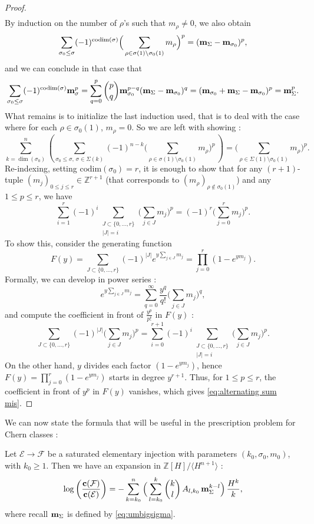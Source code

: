 \documentclass[a4paper,10pt]{amsart}
\theoremstyle{plain}{
    \newtheorem{theorem}{Theorem}[section]
    \newtheorem{lemma}[theorem]{Lemma}
    \newtheorem{corollary}[theorem]{Corollary}
    \newtheorem{proposition}[theorem]{Proposition}
    \newtheorem{conjecture}[theorem]{Conjecture}
}
\theoremstyle{definition}{
    \newtheorem{definition}[theorem]{Definition}
    \newtheorem{defn-thm}[theorem]{Definition-Theorem}
    \newtheorem{example}[theorem]{Example}
    \newtheorem{notation}[theorem]{Notation}
}
\theoremstyle{remark}{
    \newtheorem{remark}[theorem]{Remark}
    \newtheorem{problem}[theorem]{Problem}
    \newtheorem{question}[theorem]{Question}
}
\def\um{{\bf m}}
\def\uc{{\bf c}}
\def\cF{\mathcal{F}}
\def\cE{\mathcal{E}}
\def\Z{\mathbb{Z}}
\def\codim{\mathrm{codim}}
\begin{document}
\begin{proof}
$$\begin{array}{ccc}
 \end{array}
 $$
By induction on the number of $\rho$'s such that $m_\rho\neq 0$, we also obtain 
$$
\sum_{\sigma_0\leq\sigma} (-1)^{\codim(\sigma)} \Big(\sum_{\rho\in\sigma(1)\setminus\sigma_0(1)}m_\rho\Big)^p= (\um_\Sigma-\um_{\sigma_0})^p,
$$
and we can conclude in that case that 
$$
\sum_{\sigma_0\leq\sigma} (-1)^{\codim(\sigma)}\um_\sigma^p=\displaystyle \sum_{q=0}^{p} \binom{p}{q}\um_{\sigma_0}^{p-q}(\um_\Sigma-\um_{\sigma_0})^q=(\um_{\sigma_0}+\um_\Sigma-\um_{\sigma_0})^p=\um_\Sigma^p.
$$
What remains is to initialize the last induction used, that is to deal with the case where for each $\rho\in\sigma_0(1)$, $m_\rho=0$. So we are left with showing :
$$
\sum_{k=\dim(\sigma_0)}^n \left(\sum_{\sigma_0\leq\sigma,\,\sigma\in\Sigma(k)} (-1)^{n-k}\Big(\sum_{\rho\in\sigma(1)\setminus\sigma_0(1)}m_\rho\Big)^p\,\right)=\Big(\sum_{\rho\in\Sigma(1)\setminus \sigma_0(1)}m_\rho\Big)^p.
$$
Re-indexing, setting $\codim(\sigma_0)=r$, it is enough to show that for any $(r+1)$-tuple $(m_j)_{0\leq j\leq r}\in\Z^{r+1}$ (that corresponds to $(m_\rho)_{\rho\notin \sigma_0(1)}$) and any $1\leq p \leq r$, we have
\begin{equation}
 \label{eq:alternating sum mis}
\sum_{i=1}^{r} (-1)^i \sum_{\substack{J \subset \{0,\dots,r\} \\ |J|=i}} \Big(\sum_{j \in J} m_j\Big)^p=(-1)^r \Big(\sum_{j=0}^{r} m_j \Big)^p.
\end{equation}
To show this, consider the generating function
$$
F(y) = \sum_{J \subset \{0,\dots,r\}} (-1)^{|J|} e^{y \sum_{j \in J} m_j} = \prod_{j=0}^{r} (1 - e^{y m_j}).
$$
Formally, we can develop in power series :
$$
e^{y \sum_{j \in J} m_j} = \sum_{q=0}^{\infty} \frac{y^q}{q!} \Big(\sum_{j \in J} m_j\Big)^q,
$$
and compute the coefficient in front of $\displaystyle\frac{y^p}{p!}$ in $F(y)$ :
$$
\sum_{J \subset \{0,\dots,r\}} (-1)^{|J|} \Big(\sum_{j \in J} m_j\Big)^p = \sum_{i=0}^{r+1} (-1)^i \sum_{\substack{J \subset \{0,\dots,r\} \\ |J|=i}} \Big(\sum_{j \in J} m_j\Big)^p.
$$
On the other hand, $y$ divides each factor $(1-e^{y m_j})$, hence $F(y)=\prod_{j=0}^{r} (1 - e^{y m_j})$ starts in degree $y^{r+1}$.  
Thus, for $1 \leq p \leq r$, the coefficient in front of $y^p$ in $F(y)$ vanishes, which gives \eqref{eq:alternating sum mis}.
 \end{proof}
We can now state the formula that will be useful in the prescription problem for Chern classes :
\begin{proposition}
 \label{prop:log expansion chern saturated elementary}
  Let $\cE\to \cF$ be a saturated elementary injection with parameters $(k_0,\sigma_0,m_0)$, with $k_0\geq 1$. Then we have an expansion in $\Z[H]/\langle H^{n+1} \rangle$ :
 \begin{equation}
  \label{eq:log expansion saturated elementary}
  \log\left(\frac{\uc(\cF)}{\uc(\cE)}\right)=-\sum_{k=k_0}^n \Big(\sum_{l=k_0}^k \binom{k}{l}\, A_{l,k_0}\, \um_\Sigma^{k-l} \Big)\, \frac{H^k}{k},
 \end{equation}
 where recall $\um_\Sigma$ is defined by \eqref{eq:umbigsigma}.
 \end{proposition}
 
\end{document}
